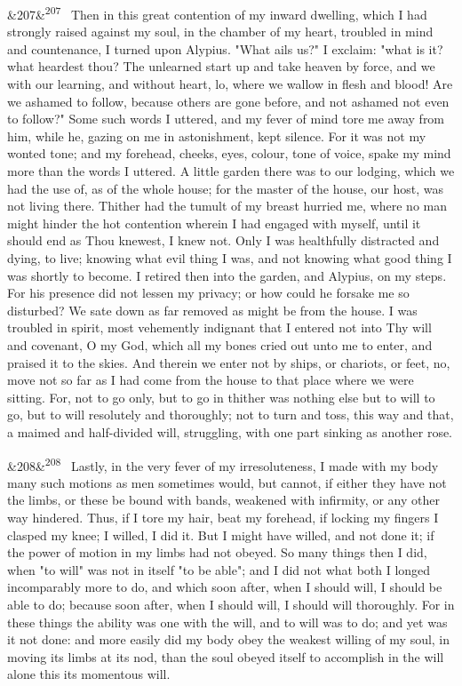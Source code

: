 \documentclass[12pt]{article}
\newcommand{\para}[1][]{\par\noindent\ifx&#1&\else\textsuperscript{\footnotesize #1}~\fi}
\begin{document}
\para[207] Then in this great contention of my inward dwelling, which I had strongly raised against my soul, in the chamber of my heart, troubled in mind and countenance, I turned upon Alypius. "What ails us?" I exclaim: "what is it? what heardest thou? The unlearned start up and take heaven by force, and we with our learning, and without heart, lo, where we wallow in flesh and blood! Are we ashamed to follow, because others are gone before, and not ashamed not even to follow?" Some such words I uttered, and my fever of mind tore me away from him, while he, gazing on me in astonishment, kept silence. For it was not my wonted tone; and my forehead, cheeks, eyes, colour, tone of voice, spake my mind more than the words I uttered. A little garden there was to our lodging, which we had the use of, as of the whole house; for the master of the house, our host, was not living there. Thither had the tumult of my breast hurried me, where no man might hinder the hot contention wherein I had engaged with myself, until it should end as Thou knewest, I knew not. Only I was healthfully distracted and dying, to live; knowing what evil thing I was, and not knowing what good thing I was shortly to become. I retired then into the garden, and Alypius, on my steps. For his presence did not lessen my privacy; or how could he forsake me so disturbed? We sate down as far removed as might be from the house. I was troubled in spirit, most vehemently indignant that I entered not into Thy will and covenant, O my God, which all my bones cried out unto me to enter, and praised it to the skies. And therein we enter not by ships, or chariots, or feet, no, move not so far as I had come from the house to that place where we were sitting. For, not to go only, but to go in thither was nothing else but to will to go, but to will resolutely and thoroughly; not to turn and toss, this way and that, a maimed and half-divided will, struggling, with one part sinking as another rose.

\para[208] Lastly, in the very fever of my irresoluteness, I made with my body many such motions as men sometimes would, but cannot, if either they have not the limbs, or these be bound with bands, weakened with infirmity, or any other way hindered. Thus, if I tore my hair, beat my forehead, if locking my fingers I clasped my knee; I willed, I did it. But I might have willed, and not done it; if the power of motion in my limbs had not obeyed. So many things then I did, when "to will" was not in itself "to be able"; and I did not what both I longed incomparably more to do, and which soon after, when I should will, I should be able to do; because soon after, when I should will, I should will thoroughly. For in these things the ability was one with the will, and to will was to do; and yet was it not done: and more easily did my body obey the weakest willing of my soul, in moving its limbs at its nod, than the soul obeyed itself to accomplish in the will alone this its momentous will.
\end{document}
